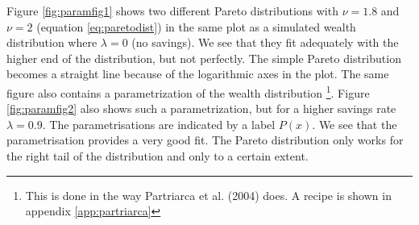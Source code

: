 \documentclass[10pt, a4paper]{amsart}
\begin{document}
Figure \ref{fig:paramfig1} shows two different Pareto distributions with $\nu=1.8$ and $\nu = 2$ (equation \ref{eq:paretodist}) in the same plot as a simulated wealth distribution where $\lambda = 0$ (no savings). We see that they fit adequately with the higher end of the distribution, but not perfectly. The simple Pareto distribution becomes a straight line because of the logarithmic axes in the plot. The same figure also contains a parametrization of the wealth distribution \footnote{This is done in the way Partriarca et al. (2004)\cite{Patriarca} does. A recipe is shown in appendix \ref{app:partriarca}}. Figure \ref{fig:paramfig2} also shows such a parametrization, but for a higher savings rate $\lambda=0.9$. The parametrisations are indicated by a label $P(x)$. We see that the parametrisation provides a very good fit. The Pareto distribution only works for the right tail of the distribution and only to a certain extent.
\end{document}
